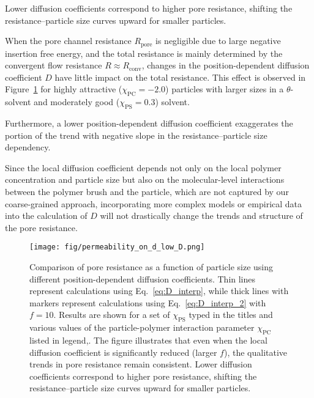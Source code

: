 \documentclass[10pt, a4paper]{article}
\begin{document}
\begin{multicols}{2}
Lower diffusion coefficients correspond to higher pore resistance, shifting the resistance–particle size curves upward for smaller particles.

When the pore channel resistance $R_{\text{pore}}$ is negligible due to large negative insertion free energy, and the total resistance is mainly determined by the convergent flow resistance $R \approx R_{\text{conv}}$, changes in the position-dependent diffusion coefficient $D$ have little impact on the total resistance. This effect is observed in Figure~\ref{fig:permeability_ond_low_D} for highly attractive ($\chi_{\text{PC}} = -2.0$) particles with larger sizes in a $\theta$-solvent and moderately good ($\chi_{\text{PS}} = 0.3$) solvent.

Furthermore, a lower position-dependent diffusion coefficient exaggerates the portion of the trend with negative slope in the resistance–particle size dependency.

Since the local diffusion coefficient depends not only on the local polymer concentration and particle size but also on the molecular-level interactions between the polymer brush and the particle, which are not captured by our coarse-grained approach, incorporating more complex models or empirical data into the calculation of $D$ will not drastically change the trends and structure of the pore resistance.


\end{multicols}

\begin{figure}[H]
    \centering
    \texttt{[image: fig/permeability\_on\_d\_low\_D.png]}
    \caption{
        Comparison of pore resistance as a function of particle size using different position-dependent diffusion coefficients.
        Thin lines represent calculations using Eq.~\ref{eq:D_interp}, while thick lines with markers represent calculations using Eq.~\ref{eq:D_interp_2} with $f = 10$.
        Results are shown for a set of $\chi_{\text{PS}}$ typed in the titles and various values of the particle-polymer interaction parameter $\chi_{\text{PC}}$ listed in legend,.
        The figure illustrates that even when the local diffusion coefficient is significantly reduced (larger $f$), the qualitative trends in pore resistance remain consistent.
        Lower diffusion coefficients correspond to higher pore resistance, shifting the resistance–particle size curves upward for smaller particles.
        }
    \label{fig:permeability_ond_low_D}
\end{figure}
\end{document}
